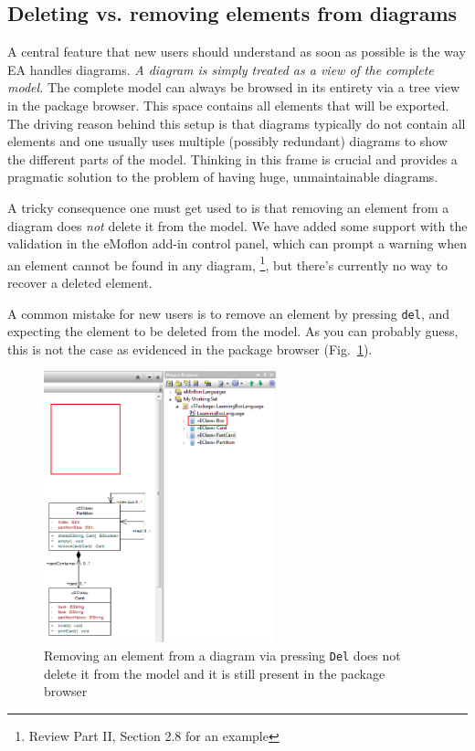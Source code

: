 \subsection{Deleting vs. removing elements from diagrams} 

A central feature that new users should understand as soon as possible is the way EA handles diagrams. \emph{A diagram is simply treated as a \emph{view} of the
complete model.} The complete model can always be browsed in its entirety via a tree view in the package browser. This space contains all elements that will be
exported. The driving reason behind this setup is that diagrams typically do not contain all elements and one usually uses multiple (possibly redundant)
diagrams to show the different parts of the model. Thinking in this frame is crucial and provides a pragmatic solution to the problem of having huge,
unmaintainable diagrams.

A tricky consequence one must get used to is that removing an element from a diagram does \emph{not} delete it from the model. We have added some support
with the validation in the eMoflon add-in control panel, which can prompt a warning when an element cannot be found in any diagram, \footnote{Review Part II,
Section 2.8 for an example}, but there's currently no way to recover a deleted element.

A common mistake for new users is to remove an element by pressing \texttt{del}, and expecting the element to be deleted from the model. As you can probably
guess, this is not the case as evidenced in the package browser (Fig.~\ref{ea:partiallyDeleted}).

\vspace{0.5cm}

\begin{figure}[htbp]
\begin{center} 
\includegraphics[width=0.6\textwidth]{ea_partiallyDeleted}
  \caption{Removing an element from a diagram via pressing \texttt{Del} does not delete it from the model and it is still present in the package browser}  
    \label{ea:partiallyDeleted}
\end{center}
\end{figure}  

